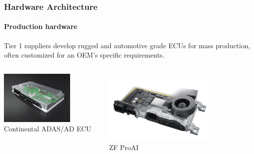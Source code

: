 \begin{frame}
\frametitle{Hardware Architecture}
\framesubtitle{Production hardware}
Tier 1 suppliers develop rugged and automotive grade ECUs for mass production,
often customized for an OEM's specific requirements.\\
\vspace{0.2cm}
\begin{columns}[]
    \begin{column}{0.5\textwidth}
        \centering
        \includegraphics[width=0.7\textwidth]{images/continental_ecu.jpg}\\
        \footnotesize Continental ADAS/AD ECU\footnotemark[1]
    \end{column}
    \begin{column}{0.5\textwidth}
        \centering
        \includegraphics[width=0.7\textwidth]{images/zf_ecu.jpg}\\
        \footnotesize ZF ProAI\footnotemark[2]
    \end{column}
\end{columns}
\end{frame}

